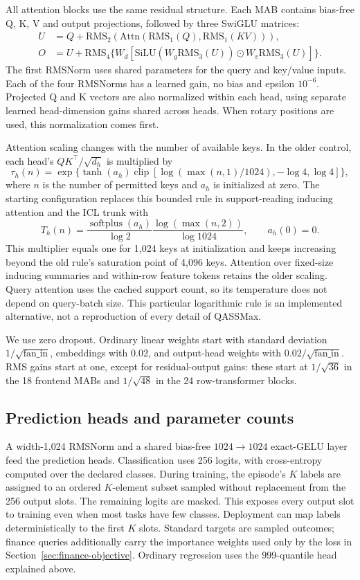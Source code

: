 \documentclass[11pt]{article}
\begin{document}
All attention blocks use the same residual structure. Each MAB contains bias-free Q, K, V and output projections, followed by three SwiGLU matrices:
\[
\begin{aligned}
 U&=Q+\mathrm{RMS}_2(\mathrm{Attn}(\mathrm{RMS}_1(Q),\mathrm{RMS}_1(KV))),\\
 O&=U+\mathrm{RMS}_4\{W_d[\mathrm{SiLU}(W_g\mathrm{RMS}_3(U))\odot W_v\mathrm{RMS}_3(U)]\}.
\end{aligned}
\]
The first RMSNorm uses shared parameters for the query and key/value inputs. Each of the four RMSNorms has a learned gain, no bias and epsilon $10^{-6}$. Projected Q and K vectors are also normalized within each head, using separate learned head-dimension gains shared across heads. When rotary positions are used, this normalization comes first.

Attention scaling changes with the number of available keys. In the older control, each head's $QK^\top/\sqrt{d_h}$ is multiplied by
\[\tau_h(n)=\exp\{\tanh(a_h)\operatorname{clip}[\log(\max(n,1)/1024),-\log4,\log4]\},\]
where $n$ is the number of permitted keys and $a_h$ is initialized at zero. The starting configuration replaces this bounded rule in support-reading inducing attention and the ICL trunk with
\[
T_h(n)=\frac{\operatorname{softplus}(a_h)}{\log 2}
        \frac{\log(\max(n,2))}{\log 1024},\qquad a_h(0)=0.
\]
This multiplier equals one for 1,024 keys at initialization and keeps increasing beyond the old rule's saturation point of 4,096 keys. Attention over fixed-size inducing summaries and within-row feature tokens retains the older scaling. Query attention uses the cached support count, so its temperature does not depend on query-batch size. This particular logarithmic rule is an implemented alternative, not a reproduction of every detail of QASSMax.

We use zero dropout. Ordinary linear weights start with standard deviation $1/\sqrt{\mathrm{fan\_in}}$, embeddings with 0.02, and output-head weights with $0.02/\sqrt{\mathrm{fan\_in}}$. RMS gains start at one, except for residual-output gains: these start at $1/\sqrt{36}$ in the 18 frontend MABs and $1/\sqrt{48}$ in the 24 row-transformer blocks.

\subsection{Prediction heads and parameter counts}
\label{sec:heads}

A width-1,024 RMSNorm and a shared bias-free $1024\to1024$ exact-GELU layer feed the prediction heads. Classification uses 256 logits, with cross-entropy computed over the declared classes. During training, the episode's $K$ labels are assigned to an ordered $K$-element subset sampled without replacement from the 256 output slots. The remaining logits are masked. This exposes every output slot to training even when most tasks have few classes. Deployment can map labels deterministically to the first $K$ slots. Standard targets are sampled outcomes; finance queries additionally carry the importance weights used only by the loss in Section~\ref{sec:finance-objective}. Ordinary regression uses the 999-quantile head explained above.
\end{document}
